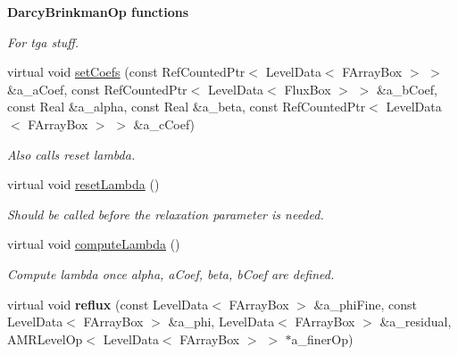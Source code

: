 \begin{Indent}{\bf Darcy\-Brinkman\-Op functions}
\begin{DoxyCompactItemize}
\begin{DoxyCompactList}\small\item\em For tga stuff. \end{DoxyCompactList}\item 
\hypertarget{class_darcy_brinkman_op_afc3972638ccf8fb63e080a533f66efcc}{virtual void \hyperlink{class_darcy_brinkman_op_afc3972638ccf8fb63e080a533f66efcc}{set\-Coefs} (const Ref\-Counted\-Ptr$<$ Level\-Data$<$ F\-Array\-Box $>$ $>$ \&a\-\_\-a\-Coef, const Ref\-Counted\-Ptr$<$ Level\-Data$<$ Flux\-Box $>$ $>$ \&a\-\_\-b\-Coef, const Real \&a\-\_\-alpha, const Real \&a\-\_\-beta, const Ref\-Counted\-Ptr$<$ Level\-Data$<$ F\-Array\-Box $>$ $>$ \&a\-\_\-c\-Coef)}\label{class_darcy_brinkman_op_afc3972638ccf8fb63e080a533f66efcc}

\begin{DoxyCompactList}\small\item\em Also calls reset lambda. \end{DoxyCompactList}\item 
\hypertarget{class_darcy_brinkman_op_a35fa524145af3a0641f10817ce291b0b}{virtual void \hyperlink{class_darcy_brinkman_op_a35fa524145af3a0641f10817ce291b0b}{reset\-Lambda} ()}\label{class_darcy_brinkman_op_a35fa524145af3a0641f10817ce291b0b}

\begin{DoxyCompactList}\small\item\em Should be called before the relaxation parameter is needed. \end{DoxyCompactList}\item 
\hypertarget{class_darcy_brinkman_op_aa6b2a052c4d143cd0b946518cd19f313}{virtual void \hyperlink{class_darcy_brinkman_op_aa6b2a052c4d143cd0b946518cd19f313}{compute\-Lambda} ()}\label{class_darcy_brinkman_op_aa6b2a052c4d143cd0b946518cd19f313}

\begin{DoxyCompactList}\small\item\em Compute lambda once alpha, a\-Coef, beta, b\-Coef are defined. \end{DoxyCompactList}\item 
\hypertarget{class_darcy_brinkman_op_a1e8a4aec2b75bd325cf0d89feb0f0581}{virtual void {\bfseries reflux} (const Level\-Data$<$ F\-Array\-Box $>$ \&a\-\_\-phi\-Fine, const Level\-Data$<$ F\-Array\-Box $>$ \&a\-\_\-phi, Level\-Data$<$ F\-Array\-Box $>$ \&a\-\_\-residual, A\-M\-R\-Level\-Op$<$ Level\-Data$<$ F\-Array\-Box $>$ $>$ $\ast$a\-\_\-finer\-Op)}\label{class_darcy_brinkman_op_a1e8a4aec2b75bd325cf0d89feb0f0581}

\end{DoxyCompactItemize}
\end{Indent}
